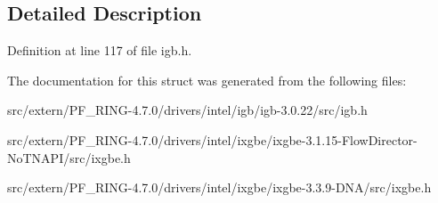 \subsection{Detailed Description}


Definition at line 117 of file igb.h.



The documentation for this struct was generated from the following files:\begin{DoxyCompactItemize}
\item 
src/extern/PF\_\-RING-\/4.7.0/drivers/intel/igb/igb-\/3.0.22/src/igb.h\item 
src/extern/PF\_\-RING-\/4.7.0/drivers/intel/ixgbe/ixgbe-\/3.1.15-\/FlowDirector-\/NoTNAPI/src/ixgbe.h\item 
src/extern/PF\_\-RING-\/4.7.0/drivers/intel/ixgbe/ixgbe-\/3.3.9-\/DNA/src/ixgbe.h\end{DoxyCompactItemize}
